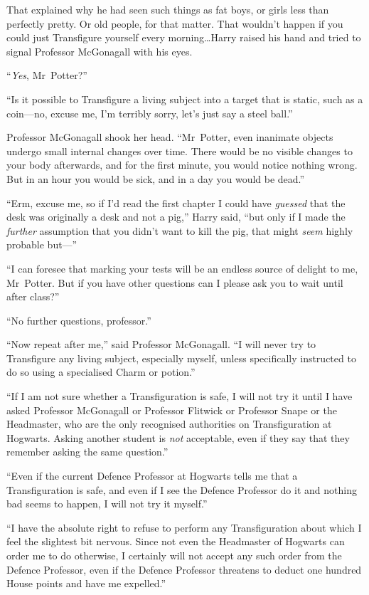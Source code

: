 That explained why he had seen such things as fat boys, or girls less than perfectly pretty. Or old people, for that matter. That wouldn’t happen if you could just Transfigure yourself every morning…Harry raised his hand and tried to signal Professor McGonagall with his eyes.

“\emph{Yes}, Mr~Potter?”

“Is it possible to Transfigure a living subject into a target that is static, such as a coin—no, excuse me, I’m terribly sorry, let’s just say a steel ball.”

Professor McGonagall shook her head. “Mr~Potter, even inanimate objects undergo small internal changes over time. There would be no visible changes to your body afterwards, and for the first minute, you would notice nothing wrong. But in an hour you would be sick, and in a day you would be dead.”

“Erm, excuse me, so if I’d read the first chapter I could have \emph{guessed} that the desk was originally a desk and not a pig,” Harry said, “but only if I made the \emph{further} assumption that you didn’t want to kill the pig, that might \emph{seem} highly probable but—”

“I can foresee that marking your tests will be an endless source of delight to me, Mr~Potter. But if you have other questions can I please ask you to wait until after class?”

“No further questions, professor.”

“Now repeat after me,” said Professor McGonagall. “I will never try to Transfigure any living subject, especially myself, unless specifically instructed to do so using a specialised Charm or potion.”

“If I am not sure whether a Transfiguration is safe, I will not try it until I have asked Professor McGonagall or Professor Flitwick or Professor Snape or the Headmaster, who are the only recognised authorities on Transfiguration at Hogwarts. Asking another student is \emph{not} acceptable, even if they say that they remember asking the same question.”

“Even if the current Defence Professor at Hogwarts tells me that a Transfiguration is safe, and even if I see the Defence Professor do it and nothing bad seems to happen, I will not try it myself.”

“I have the absolute right to refuse to perform any Transfiguration about which I feel the slightest bit nervous. Since not even the Headmaster of Hogwarts can order me to do otherwise, I certainly will not accept any such order from the Defence Professor, even if the Defence Professor threatens to deduct one hundred House points and have me expelled.”

